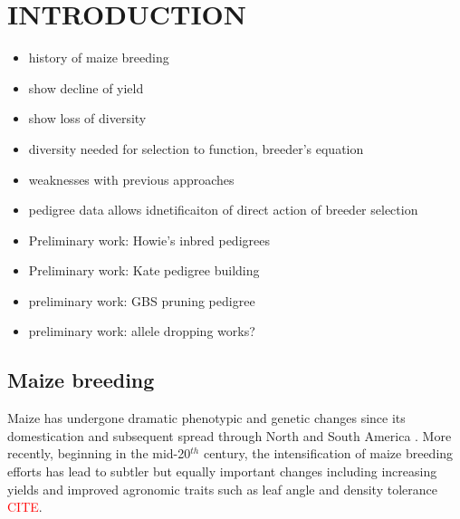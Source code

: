 \documentclass[12pt]{article}
\begin{document}
\section*{INTRODUCTION}
\label{sec:introduction}


\begin{itemize}
\item history of maize breeding
\item show decline of yield
\item show loss of diversity
\item diversity needed for selection to function, breeder's equation
\item weaknesses with previous approaches
\item pedigree data allows idnetificaiton of direct action of breeder selection
\item Preliminary work: Howie's inbred pedigrees
\item Preliminary work: Kate pedigree building
\item preliminary work: GBS pruning pedigree
\item preliminary work: allele dropping works?
\end{itemize}

\subsection*{Maize breeding}
Maize has undergone dramatic phenotypic and genetic changes since its domestication and subsequent spread through North and South America \citep{daFonseca:2015ey,Doebley:2004ce}. More recently, beginning in the mid-20$^{th}$ century, the intensification of maize breeding efforts has lead to subtler but equally important changes including increasing yields and improved agronomic traits such as leaf angle and density tolerance \textcolor{red}{CITE}. 

\end{document}
